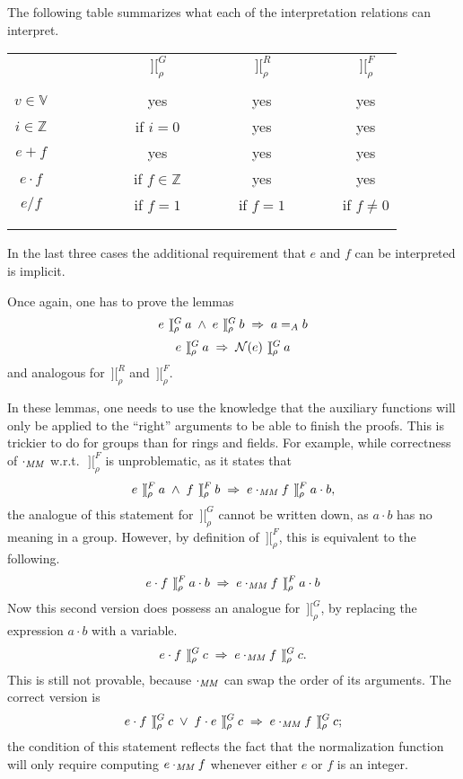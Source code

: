 \documentclass[runningheads]{llncs}
\newcommand{\intII}{\,]\![}
\newcommand{\intrelG}{\mathbin{\intII_\rho^G}}
\newcommand{\intrelF}{\mathbin{\intII_\rho^F}}
\newcommand{\intrelR}{\mathbin{\intII_\rho^R}}
\newcommand{\N}{{\cal N}}
\newcommand{\Z}{{\mathbb Z}}
\newcommand{\V}{{\mathbb V}}
\begin{document}
The following table summarizes what each of the interpretation relations
can interpret.
\begin{center}
\begin{tabular}{crcccccc}
 &$\qquad$&$\quad$& $\intrelG$ &$\qquad$& $\intrelR$ &$\qquad$& $\intrelF$ \\
\noalign{\smallskip}
\hline
&\vline& \\
\noalign{\vspace{-0.9em}}
 $v\in\V$   &\vline&& yes         && yes        && yes          \\
 $i\in\Z$   &\vline&& if $i=0$    && yes        && yes          \\
 $e+f$      &\vline&& yes         && yes        && yes          \\
 $e\cdot f$ &\vline&& if $f\in\Z$ && yes        && yes          \\
 $e/f$      &\vline&& if $f=1$    && if $f=1$   && if $f\neq 0$ \\
\noalign{\vspace{-0.9em}}
&\vline& \\
\hline
\noalign{\smallskip}
\end{tabular}
\end{center}
\noindent In the last three cases the additional requirement that
$e$ and $f$ can be interpreted is implicit.

Once again, one has to prove the lemmas
$$
\begin{array}{c}
e \intrelG a \;\land\; e \intrelG b \;\Rightarrow\; a =_A b\\
\noalign{\medskip}
e \intrelG a \;\Rightarrow\; \N(e) \intrelG a
\end{array}
$$
\noindent and analogous for $\intrelR$ and $\intrelF$.

In these lemmas, one needs to use the knowledge that the auxiliary functions
will only be applied to the ``right'' arguments to be able to finish
the proofs.
This is trickier to do for groups than for rings and fields.
For example, while correctness of $\cdot_{\it MM}$ w.r.t.\ $\intrelF$
is unproblematic, as it states that
\[e\intrelF a \;\land\; f\intrelF b \;\Rightarrow\; e\cdot_{\it MM}f\intrelF a\cdot b,\]
\noindent
the analogue of this statement for $\intrelG$
cannot be written down, as $a\cdot b$ has no meaning in a group.
However, by definition of $\intrelF$, this is equivalent to
the following.
\[e\cdot f\intrelF a\cdot b \;\Rightarrow\; e\cdot_{\it MM}f\intrelF a\cdot b\]
Now this second version does possess an analogue for $\intrelG$,
by replacing the expression $a\cdot b$ with a variable.
\[e\cdot f\intrelG c \;\Rightarrow\; e\cdot_{\it MM} f\intrelG c.\]
\noindent This is still not provable, because $\cdot_{\it MM}$ can
swap the order of its arguments.
The correct version is
\[e\cdot f\intrelG c \;\lor\; f\cdot e\intrelG c \;\Rightarrow\; e\cdot_{\it MM} f\intrelG c;\]
\noindent
the condition of this statement
reflects the fact that the normalization function will only
require computing $e\cdot_{\it MM}f$ whenever either
$e$ or $f$ is an integer.
\end{document}
